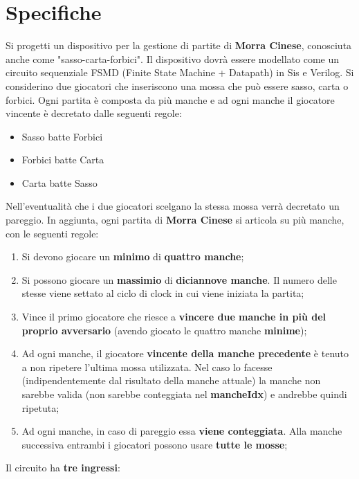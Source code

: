 \documentclass[a4paper]{article}
\begin{document}


\tableofcontents
\pagebreak

\section{Specifiche}
Si progetti un dispositivo per la gestione di partite di \textbf{Morra Cinese}, conosciuta anche come "sasso-carta-forbici".
Il dispositivo dovrà essere modellato come un circuito sequenziale FSMD (Finite State Machine + Datapath) in Sis e Verilog.
Si considerino due giocatori che inseriscono una mossa che può essere sasso, carta o forbici.
Ogni partita è composta da più manche e ad ogni manche il giocatore vincente è decretato dalle seguenti regole:
\begin{itemize}
	\item Sasso batte Forbici
	\item Forbici batte Carta
	\item Carta batte Sasso
\end{itemize}
Nell'eventualità che i due giocatori scelgano la stessa mossa verrà decretato un pareggio.
In aggiunta, ogni partita di \textbf{Morra Cinese} si articola su più manche, con le seguenti regole:
\begin{enumerate}
	\item Si devono giocare un \textbf{minimo} di \textbf{quattro manche};
	\item Si possono giocare un \textbf{massimio} di \textbf{diciannove manche}. Il numero delle stesse viene settato al ciclo di clock in cui viene iniziata la partita;
	\item Vince il primo giocatore che riesce a \textbf{vincere due manche in più del proprio avversario} (avendo giocato le quattro manche \textbf{minime});
	\item Ad ogni manche, il giocatore \textbf{vincente della manche precedente} è tenuto a non ripetere l'ultima mossa utilizzata. Nel caso lo facesse (indipendentemente dal risultato della manche attuale) la manche non sarebbe valida (non sarebbe conteggiata nel \textbf{mancheIdx}) e andrebbe quindi ripetuta;
	\item Ad ogni manche, in caso di pareggio essa \textbf{viene conteggiata}. Alla manche successiva entrambi i giocatori possono usare \textbf{tutte le mosse};
\end{enumerate}
Il circuito ha \textbf{tre ingressi}:
\end{document}
